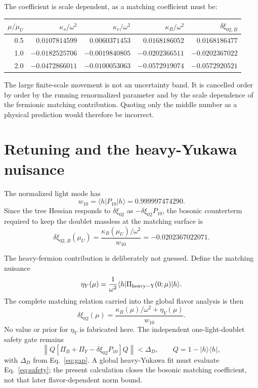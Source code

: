 \documentclass[11pt]{article}
\begin{document}
The coefficient is scale dependent, as a matching coefficient must be:
\begin{center}
\begin{tabular}{@{}rrrrr@{}}
\toprule
\(\mu/\mu_U\)&\(\kappa_s/\omega^2\)&\(\kappa_v/\omega^2\)&
\(\kappa_B/\omega^2\)&\(\delta\xi_{02,B}\)\\
\midrule
0.5& \( 0.0107814599\)&\( 0.0060371453\)&\( 0.0168186052\)&\( 0.0168186477\)\\
1.0& \(-0.0182525706\)&\(-0.0019840805\)&\(-0.0202366511\)&\(-0.0202367022\)\\
2.0& \(-0.0472866011\)&\(-0.0100053063\)&\(-0.0572919074\)&\(-0.0572920521\)\\
\bottomrule
\end{tabular}
\end{center}
The large finite-scale movement is not an uncertainty band.  It is cancelled
order by order by the running renormalized parameter and by the scale
dependence of the fermionic matching contribution.  Quoting only the middle
number as a physical prediction would therefore be incorrect.

\section{Retuning and the heavy-Yukawa nuisance}

The normalized light mode has
\begin{equation}
 w_{10}=\langle h|P_{10}|h\rangle=0.999997474290.
 \label{eq:w10}
\end{equation}
Since the tree Hessian responds to \(\delta\xi_{02}\) as
\(-\delta\xi_{02}P_{10}\), the bosonic counterterm required to keep the
doublet massless at the matching surface is
\begin{equation}
 \delta\xi_{02,B}(\mu_U)
 =\frac{\kappa_B(\mu_U)/\omega^2}{w_{10}}
 =-0.0202367022071.
 \label{eq:bosretune}
\end{equation}

The heavy-fermion contribution is deliberately not guessed.  Define the
matching nuisance
\begin{equation}
 \eta_Y(\mu)=\frac{1}{\omega^2}
 \langle h|\Pi_{\rm heavy-Y}(0;\mu)|h\rangle.
 \label{eq:etay}
\end{equation}
The complete matching relation carried into the global flavor analysis is
then
\begin{equation}
 \boxed{\delta\xi_{02}(\mu)=
 \frac{\kappa_B(\mu)/\omega^2+\eta_Y(\mu)}{w_{10}}.}
 \label{eq:fullretune}
\end{equation}
No value or prior for \(\eta_Y\) is fabricated here.  The independent
one-light-doublet safety gate remains
\begin{equation}
 \left\|Q\left[\Pi_B+\Pi_Y-\delta\xi_{02}P_{10}\right]Q\right\|
 <\Delta_D,
 \qquad Q=1-|h\rangle\langle h|,
 \label{eq:safety}
\end{equation}
with \(\Delta_D\) from Eq.~\eqref{eq:gap}.  A global heavy-Yukawa fit must
evaluate Eq.~\eqref{eq:safety}; the present calculation closes the bosonic
matching coefficient, not that later flavor-dependent norm bound.
\end{document}
